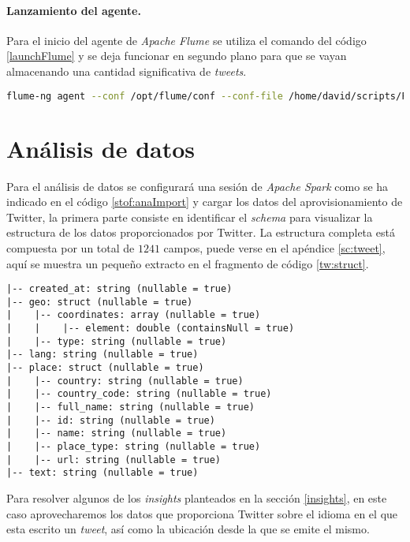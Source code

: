 \paragraph{Lanzamiento del agente.} Para el inicio del agente de \textit{Apache Flume} se utiliza el comando del código \ref{launchFlume} y se deja funcionar en segundo plano para que se vayan almacenando una cantidad significativa de \textit{tweets}.

\begin{lstlisting}[label=launchFlume,language=sh,frame=single,caption=Comando de lanzamiento del agente de \textit{Apache Flume} para \textit{Twitter}.]
flume-ng agent --conf /opt/flume/conf --conf-file /home/david/scripts/Flume-TwitterAgent.conf
\end{lstlisting}

\section{Análisis de datos}
Para el análisis de datos se configurará una sesión de \textit{Apache Spark} como se ha indicado en el código \ref{stof:anaImport} y cargar los datos del aprovisionamiento de Twitter, la primera parte consiste en identificar el \textit{schema} para visualizar la estructura de los datos proporcionados por Twitter. La estructura completa está compuesta por un total de $1241$ campos, puede verse en el apéndice \ref{sc:tweet}, aquí se muestra un pequeño extracto en el fragmento de código \ref{tw:struct}.

\begin{lstlisting}[label=tw:struct,frame=single,caption=Extracto del esquema de un \textit{tweet}.]
|-- created_at: string (nullable = true)
|-- geo: struct (nullable = true)
|    |-- coordinates: array (nullable = true)
|    |    |-- element: double (containsNull = true)
|    |-- type: string (nullable = true)
|-- lang: string (nullable = true)
|-- place: struct (nullable = true)
|    |-- country: string (nullable = true)
|    |-- country_code: string (nullable = true)
|    |-- full_name: string (nullable = true)
|    |-- id: string (nullable = true)
|    |-- name: string (nullable = true)
|    |-- place_type: string (nullable = true)
|    |-- url: string (nullable = true)
|-- text: string (nullable = true)
\end{lstlisting}

Para resolver algunos de los \textit{insights} planteados en la sección \ref{insights}, en este caso aprovecharemos los datos que proporciona Twitter sobre el idioma en el que esta escrito un \textit{tweet}, así como la ubicación desde la que se emite el mismo.

